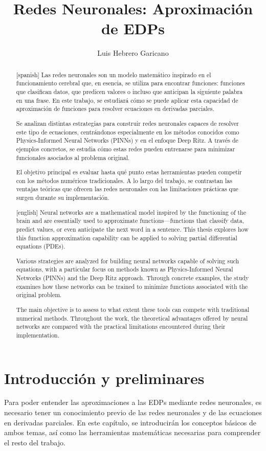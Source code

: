 \documentclass[a4paper,11pt,spanish, twoside, leqno]{tfg-uam}
\title{Redes Neuronales: Aproximación de EDPs}
\author{Luis Hebrero Garicano}
\theoremstyle{definition}
\begin{document}
\begin{abstract}[spanish]
Las redes neuronales son un modelo matemático inspirado en el funcionamiento cerebral que, en esencia, se utiliza para encontrar funciones: funciones que clasifican datos, que predicen valores o incluso que anticipan la siguiente palabra en una frase. En este trabajo, se estudiará cómo se puede aplicar esta capacidad de aproximación de funciones para resolver ecuaciones en derivadas parciales. 

Se analizan distintas estrategias para construir redes neuronales capaces de resolver este tipo de ecuaciones, centrándonos especialmente en los métodos conocidos como Physics-Informed Neural Networks (PINNs) y en el enfoque Deep Ritz. A través de ejemplos concretos, se estudia cómo estas redes pueden entrenarse para minimizar funcionales asociados al problema original.

El objetivo principal es evaluar hasta qué punto estas herramientas pueden competir con los métodos numéricos tradicionales. A lo largo del trabajo, se contrastan las ventajas teóricas que ofrecen las redes neuronales con las limitaciones prácticas que surgen durante su implementación. 
\end{abstract}
\begin{abstract}[english]
Neural networks are a mathematical model inspired by the functioning of the brain and are essentially used to approximate functions—functions that classify data, predict values, or even anticipate the next word in a sentence. This thesis explores how this function approximation capability can be applied to solving partial differential equations (PDEs).

Various strategies are analyzed for building neural networks capable of solving such equations, with a particular focus on methods known as Physics-Informed Neural Networks (PINNs) and the Deep Ritz approach. Through concrete examples, the study examines how these networks can be trained to minimize functions associated with the original problem.

The main objective is to assess to what extent these tools can compete with traditional numerical methods. Throughout the work, the theoretical advantages offered by neural networks are compared with the practical limitations encountered during their implementation.
\end{abstract}
\mainmatter


\chapter{Introducción y preliminares}\label{chap1}
\setcounter{page}{1}
Para poder entender las aproximaciones a las EDPs mediante redes neuronales, es necesario tener un conocimiento previo de las redes neuronales y de las ecuaciones en derivadas parciales. En este capítulo, se introducirán los conceptos básicos de ambos temas, así como las herramientas matemáticas necesarias para comprender el resto del trabajo.
\end{document}
